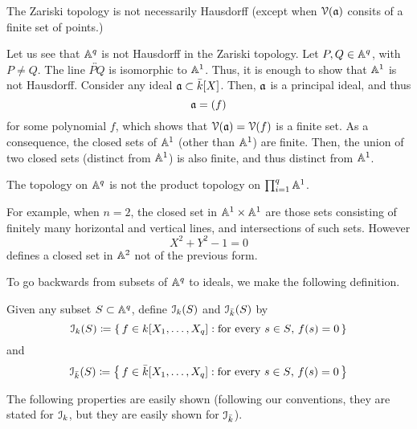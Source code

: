 The Zariski topology is not necessarily Hausdorff (except when $\mathcal{V}(\mathfrak{a})$
consits of a finite set of points.)

Let us see that $\mathbb{A}^q$ is not Hausdorff in the Zariski topology. Let
$P,Q\in\mathbb{A}^q$, with $P\neq Q$. The line $\overleftrightarrow{PQ}$ is
isomorphic to $\mathbb{A}^1$. Thus, it is enough to show that $\mathbb{A}^1$ is not
Hausdorff. Consider any ideal $\mathfrak{a}\subset\bar k[X]$. Then, $\mathfrak{a}$ is a
principal ideal, and thus
\[
\mathfrak{a}=(f)
\]
for some polynomial $f$, which shows that $\mathcal{V}(\mathfrak{a})=\mathcal{V}(f)$ is a finite
set. As a consequence, the closed sets of $\mathbb{A}^1$ (other than $\mathbb{A}^1$)
are finite. Then, the union of two closed sets (distinct from $\mathbb{A}^1$) is
also finite, and thus distinct from $\mathbb{A}^1$.

The topology on $\mathbb{A}^q$ is not the product topology on
$\prod_{i=1}^q\mathbb{A}^1$.

For example, when $n=2$, the closed set in $\mathbb{A}^1\times\mathbb{A}^1$ are those
sets consisting of finitely many horizontal and vertical lines, and
intersections of such sets. However
\[
X^2+Y^2-1=0
\]
defines a closed set in $\mathbb{A}^2$ not of the previous form.

To go backwards from subsets of $\mathbb{A}^q$ to ideals, we make the following
definition.
\begin{definition}
 Given any subset $S\subset\mathbb{A}^q$, define $\mathcal{I}_k(S)$ and $\mathcal{I}_{\bar
   k}(S)$ by
\[
\mathcal{I}_k(S)\coloneqq\left\{\,f\in k[X_1,\dotsc,X_q]:
\text{for every $s\in S$, $f(s)=0$}\,\right\}
\]
and
\[
\mathcal{I}_{\bar k}(S)\coloneqq\left\{\,f\in\bar k[X_1,\dotsc,X_q]:
\text{for every $s\in S$, $f(s)=0$}\,\right\}
\]
\end{definition}

The following properties are easily shown (following our conventions, they
are stated for $\mathcal{I}_k$, but they are easily shown for $\mathcal{I}_{\bar k}$).

